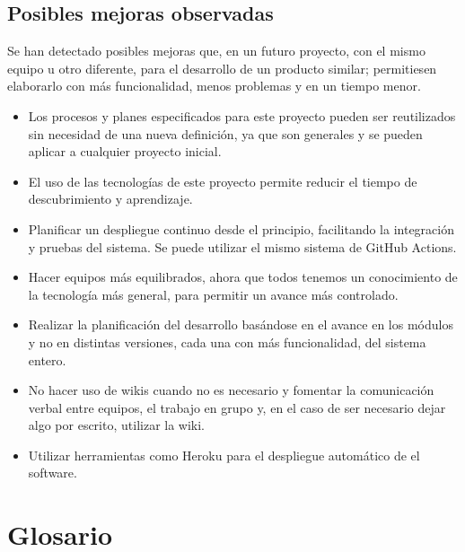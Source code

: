 \documentclass{article}
\begin{document}
\subsection*{Posibles mejoras observadas}

Se han detectado posibles mejoras que, en un futuro proyecto, con el mismo equipo u otro diferente, para el desarrollo de un producto similar; permitiesen elaborarlo con más funcionalidad, menos problemas y en un tiempo menor.

\begin{itemize}
   \setlength\itemsep{0em}
   \item Los procesos y planes especificados para este proyecto pueden ser reutilizados sin necesidad de una nueva definición, ya que son generales y se pueden aplicar a cualquier proyecto inicial.
   \item El uso de las tecnologías de este proyecto permite reducir el tiempo de descubrimiento y aprendizaje.
   \item Planificar un despliegue continuo desde el principio, facilitando la integración y pruebas del sistema. Se puede utilizar el mismo sistema de GitHub Actions.
   \item Hacer equipos más equilibrados, ahora que todos tenemos un conocimiento de la tecnología más general, para permitir un avance más controlado.
   \item Realizar la planificación del desarrollo basándose en el avance en los módulos y no en distintas versiones, cada una con más funcionalidad, del sistema entero.
   \item No hacer uso de wikis cuando no es necesario y fomentar la comunicación verbal entre equipos, el trabajo en grupo y, en el caso de ser necesario dejar algo por escrito, utilizar la wiki.
   \item Utilizar herramientas como Heroku para el despliegue automático de el software.
\end{itemize}

\pagebreak

\section*{Glosario}
\end{document}

